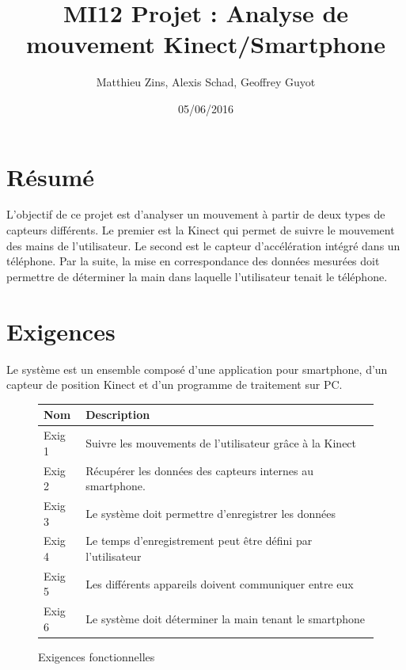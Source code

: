 \documentclass[12pt, french]{article}
\begin{document}
\title{MI12 Projet : Analyse de mouvement Kinect/Smartphone}
\author{Matthieu Zins, Alexis Schad, Geoffrey Guyot}
\date{05/06/2016}


\maketitle

\section{Résumé}

L'objectif de ce projet est d'analyser un mouvement à partir de deux types de capteurs différents. Le premier est la Kinect qui permet de suivre le mouvement des mains de l'utilisateur. Le second est le capteur d'accélération intégré dans un téléphone. Par la suite, la mise en correspondance des données mesurées doit permettre de déterminer la main dans laquelle l'utilisateur tenait le téléphone.

\section{Exigences}

Le système est un ensemble composé d’une application pour smartphone, d’un capteur de position Kinect et d’un programme de traitement sur PC.

\begin{figure}
\begin{center}
\begin{tabular}{|l|l|}
  \hline
  Nom & Description \\
  \hline
  Exig 1 & Suivre les mouvements de l’utilisateur grâce à la Kinect \\
  Exig 2 & Récupérer les données des capteurs internes au smartphone. \\
  Exig 3 & Le système doit permettre d'enregistrer les données \\
  Exig 4 & Le temps d'enregistrement peut être défini par l'utilisateur \\
  Exig 5 & Les différents appareils doivent communiquer entre eux \\
  Exig 6 & Le système doit déterminer la main tenant le smartphone \\
  \hline
\end{tabular}
\end{center}
\caption{Exigences fonctionnelles}
\end{figure}
\hfill \break
\end{document}
